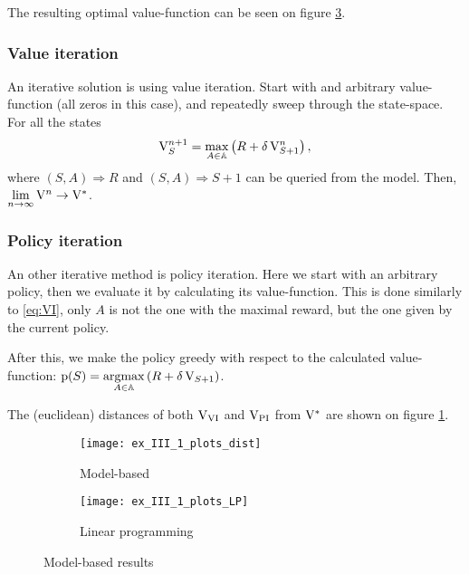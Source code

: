 The resulting optimal value-function can be seen on figure \ref{fig:LP}.

\subsubsection{Value iteration}

An iterative solution is using value iteration.
Start with and arbitrary value-function (all zeros in this case),
and repeatedly sweep through the state-space. For all the states
\begin{equation}\label{eq:VI}
	\mathrm{V}_S^{n+1} = \max\limits_{A\in\mathbb{A}}\left(R + \delta\,\mathrm{V}_{S+1}^n\right),
\end{equation}
where $(S,A)\Rightarrow R$ and $(S,A)\Rightarrow S+1$
can be queried from the model.
Then, $\lim\limits_{n\rightarrow\infty}\mathrm{V}^n\rightarrow\mathrm{V}^*$.

\subsubsection{Policy iteration}\label{sssec:PI}

An other iterative method is policy iteration.
Here we start with an arbitrary policy, then we evaluate it by calculating its value-function.
This is done similarly to \ref{eq:VI}, only $A$ is not the one with the maximal reward,
but the one given by the current policy.

After this, we make the policy greedy with respect to the calculated value-function:
$\mathrm{p}(S)=\underset{A\in\mathbb{A}}{\operatorname{argmax}}\left(R + \delta\,\mathrm{V}_{S+1}\right)$.

The (euclidean) distances of both $\mathrm{V}_\text{VI}$ and $\mathrm{V}_\text{PI}$ from $\mathrm{V}^*$ are
shown on figure \ref{fig:dist-1}.

\begin{figure}[H]
	\centering
	\begin{subfigure}{.45\textwidth}
		\centering
		\texttt{[image: ex\_III\_1\_plots\_dist]}
		\caption{Model-based}
		\label{fig:dist-1}
	\end{subfigure}
	\begin{subfigure}{.45\textwidth}
		\centering
		\texttt{[image: ex\_III\_1\_plots\_LP]}
		\caption{Linear programming}
		\label{fig:LP}
	\end{subfigure}
	\caption{Model-based results}
\end{figure}

